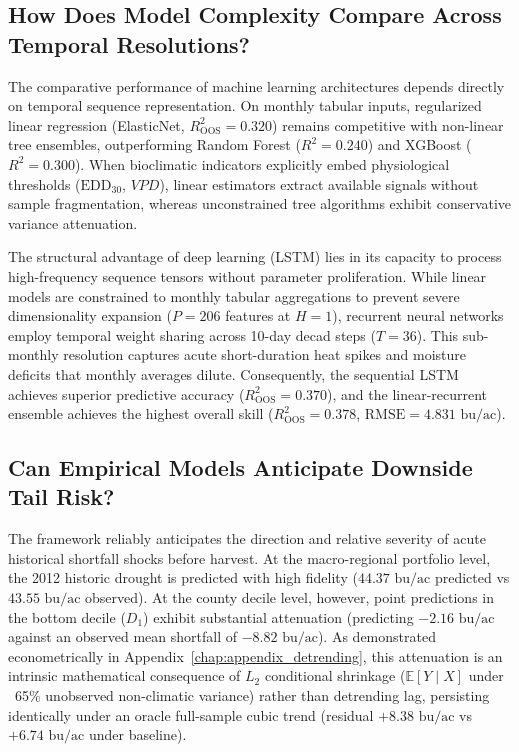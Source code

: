 \subsection{How Does Model Complexity Compare Across Temporal Resolutions?}
The comparative performance of machine learning architectures depends directly on temporal sequence representation. On monthly tabular inputs, regularized linear regression (ElasticNet, $R^2_{\text{OOS}} = 0.320$) remains competitive with non-linear tree ensembles, outperforming Random Forest ($R^2 = 0.240$) and XGBoost ($R^2 = 0.300$). When bioclimatic indicators explicitly embed physiological thresholds ($\text{EDD}_{30}$, $VPD$), linear estimators extract available signals without sample fragmentation, whereas unconstrained tree algorithms exhibit conservative variance attenuation. 

The structural advantage of deep learning (LSTM) lies in its capacity to process high-frequency sequence tensors without parameter proliferation. While linear models are constrained to monthly tabular aggregations to prevent severe dimensionality expansion ($P = 206$ features at $H=1$), recurrent neural networks employ temporal weight sharing across 10-day decad steps ($T=36$). This sub-monthly resolution captures acute short-duration heat spikes and moisture deficits that monthly averages dilute. Consequently, the sequential LSTM achieves superior predictive accuracy ($R^2_{\text{OOS}} = 0.370$), and the linear-recurrent ensemble achieves the highest overall skill ($R^2_{\text{OOS}} = 0.378$, $\text{RMSE} = 4.831\text{ bu/ac}$).

\subsection{Can Empirical Models Anticipate Downside Tail Risk?}
The framework reliably anticipates the direction and relative severity of acute historical shortfall shocks before harvest. At the macro-regional portfolio level, the 2012 historic drought is predicted with high fidelity ($44.37\text{ bu/ac}$ predicted vs $43.55\text{ bu/ac}$ observed). At the county decile level, however, point predictions in the bottom decile ($D_1$) exhibit substantial attenuation (predicting $-2.16\text{ bu/ac}$ against an observed mean shortfall of $-8.82\text{ bu/ac}$). As demonstrated econometrically in Appendix~\ref{chap:appendix_detrending}, this attenuation is an intrinsic mathematical consequence of $L_2$ conditional shrinkage ($\mathbb{E}[Y \mid X]$ under ~65\% unobserved non-climatic variance) rather than detrending lag, persisting identically under an oracle full-sample cubic trend (residual $+8.38\text{ bu/ac}$ vs $+6.74\text{ bu/ac}$ under baseline).


